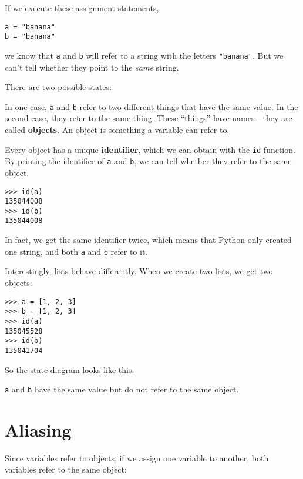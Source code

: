 If we execute these assignment statements,

\beforeverb
\begin{verbatim}
a = "banana"
b = "banana"
\end{verbatim}
\afterverb
%
we know that {\tt a} and {\tt b} will refer to a
string with the letters {\tt "banana"}.  But we can't
tell whether they point to the {\em same} string.

There are two possible states:

\beforefig
\centerline{}
\afterfig

In one case, {\tt a} and {\tt b} refer to two different things that
have the same value.  In the second case, they refer to the same
thing.  These ``things'' have names---they are called {\bf objects}.
An object is something a variable can refer to.

Every object has a unique {\bf identifier}, which we can obtain with
the {\tt id} function.  By printing the identifier of {\tt a}
and {\tt b}, we can tell whether they refer to the same object.

\beforeverb
\begin{verbatim}
>>> id(a)
135044008
>>> id(b)
135044008
\end{verbatim}
\afterverb
%
In fact, we get the same identifier twice, which means that
Python only created one string,
and both {\tt a} and {\tt b} refer to it.

Interestingly, lists behave differently.
When we create two lists, we get two objects:

\beforeverb
\begin{verbatim}
>>> a = [1, 2, 3]
>>> b = [1, 2, 3]
>>> id(a)
135045528
>>> id(b)
135041704
\end{verbatim}
\afterverb
%

So the state diagram looks like this:

\beforefig
\centerline{}
\afterfig

{\tt a} and {\tt b} have the same value but do not
refer to the same object.


\section{Aliasing}

Since variables refer to objects, if we assign one
variable to another, both variables refer to the same object:

